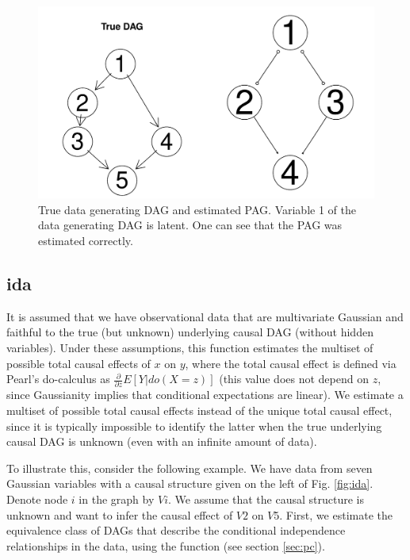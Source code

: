\documentclass[article]{jss}
\begin{document}
\begin{figure}
  \begin{center}
\includegraphics{pcalgDoc-013}
\caption{True data generating DAG and estimated PAG. Variable 1 of the data
generating DAG is latent. One can see that the PAG was estimated correctly.}
\label{fig:fci}
\end{center}
\end{figure}

\subsection{ida} \label{sec:ida}
It is assumed that we have observational data that are multivariate
Gaussian and faithful to the true (but unknown) underlying causal DAG
(without hidden variables).  Under these assumptions, this function
estimates the multiset of possible total causal effects of $x$ on $y$,
where the total causal effect is defined via Pearl's do-calculus as
$\frac{\partial}{\partial z} E[Y|do(X=z)]$ (this value does not depend on $z$, since
Gaussianity implies that conditional expectations are linear). We estimate
a multiset of possible total causal effects instead of the unique total causal
effect, since it is typically impossible to identify the latter when the
true underlying causal DAG is unknown (even with an infinite amount of
data).

To illustrate this, consider the following example. We have data from seven
Gaussian variables with a causal structure given on the left of
Fig. \ref{fig:ida}. Denote node $i$ in the graph by $Vi$. We assume that
the causal structure is unknown and want to infer the causal effect of $V2$
on $V5$. First, we estimate the equivalence class of DAGs that describe the
conditional independence relationships in the data, using the function
 (see section \ref{sec:pc}).
\end{document}
